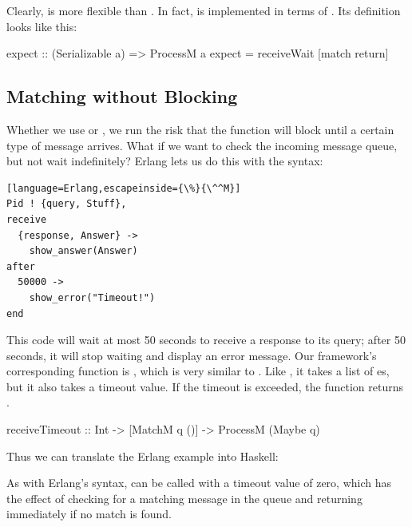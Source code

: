 \documentclass[preprint]{sigplanconf}
\begin{document}
Clearly,  is more flexible than . In fact,  is implemented in terms of . Its definition looks like this:

\begin{code}
expect :: (Serializable a) => ProcessM a
expect = receiveWait [match return]
\end{code}

\subsection{Matching without Blocking}

Whether we use  or , we run the risk that the function will block until a certain type of message arrives. What if we want to check the incoming message queue, but not wait indefinitely? Erlang lets us do this with the  syntax:

\begin{lstlisting}[language=Erlang,escapeinside={\%}{\^^M}]
Pid ! {query, Stuff},
receive
  {response, Answer} ->
    show_answer(Answer)
after
  50000 ->
    show_error("Timeout!")
end
\end{lstlisting}

This code will wait at most 50 seconds to receive a response to its query; after 50 seconds, it will stop waiting and display an error message. Our framework's corresponding function is , which is very similar to . Like , it takes a list of es, but it also takes a timeout value. If the timeout is exceeded, the function returns .

\begin{code}
receiveTimeout :: Int -> [MatchM q ()] -> 
											ProcessM (Maybe q)
\end{code}

\noindent
Thus we can translate the Erlang example into Haskell:


As with Erlang's  syntax,  can be called with a timeout value of zero, which has the effect of checking for a matching message in the queue and returning immediately if no match is found.
\end{document}
